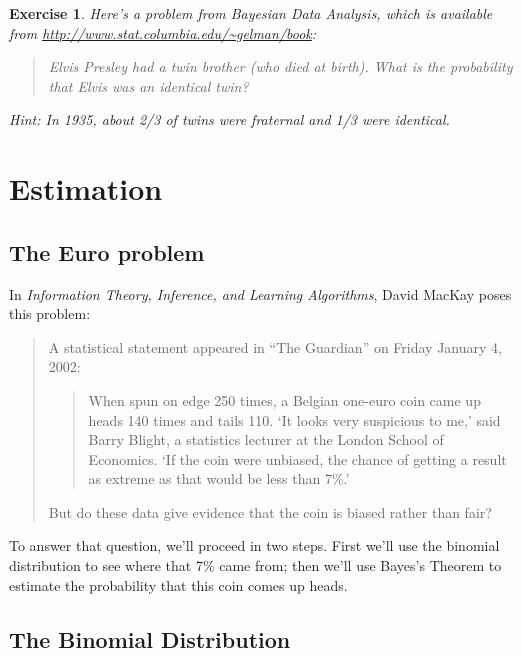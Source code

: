 \documentclass[12pt]{book}
\theoremstyle{exercise}
\newtheorem{exercise}{Exercise}[chapter]
\begin{document}
\begin{exercise}
Here's a problem from {\it Bayesian Data Analysis}, which is available from \url{http://www.stat.columbia.edu/~gelman/book}:

\begin{quote}
Elvis Presley had a twin brother (who died at birth). What is the probability that Elvis was an identical twin?
\end{quote}

Hint: In 1935, about 2/3 of twins were fraternal and 1/3 were identical.
\end{exercise}


\chapter{Estimation}
\label{more}



\section{The Euro problem}
\label{euro}

In {\it Information Theory, Inference, and Learning Algorithms}, David MacKay poses this problem:

\begin{quote}
A statistical statement appeared in ``The Guardian'' on Friday January 4, 2002:

  \begin{quote}
        When spun on edge 250 times, a Belgian one-euro coin came
        up heads 140 times and tails 110.  `It looks very suspicious
        to me,' said Barry Blight, a statistics lecturer at the London
        School of Economics.  `If the coin were unbiased, the chance of
        getting a result as extreme as that would be less than 7\%.'
        \end{quote}

But do these data give evidence that the coin is biased rather than fair?
\end{quote}

To answer that question, we'll proceed in two steps.
First we'll use the binomial distribution to see where that 7\% came from; then we'll use Bayes's Theorem to estimate the probability that this coin comes up heads.


\section{The Binomial Distribution}
\end{document}

